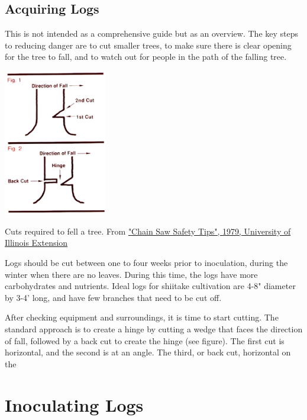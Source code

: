 \documentclass{tufte-handout}
\begin{document}
\subsection{Acquiring Logs}


This is not intended as a comprehensive guide but as an overview.
The key steps to reducing danger are to cut smaller trees, to make sure there is clear opening for the tree to fall, and to watch out for people in the path of the falling tree.


\begin{marginfigure}
\includegraphics[width=4.5cm]{uiextension-treefelling.png}
\caption{Cuts required to fell a tree. From \href{http://www.aces.uiuc.edu/vista/html_pubs/saw/saw.html}{"Chain Saw Safety Tips", 1979, University of Illinois Extension}}
\end{marginfigure}


Logs should be cut between one to four weeks prior to inoculation, during the winter when there are no leaves. 
During this time, the logs have more carbohydrates and nutrients. 
Ideal logs for shiitake cultivation are 4-8" diameter by 3-4' long, and have few branches that need to be cut off.

After checking equipment and surroundings, it is time to start cutting.
The standard approach is to create a hinge by cutting a wedge that faces the direction of fall, followed by a back cut to create the hinge (see figure). The first cut is horizontal, and the second is at an angle. The third, or back cut, horizontal on the 

\section{Inoculating Logs}

\end{document}
